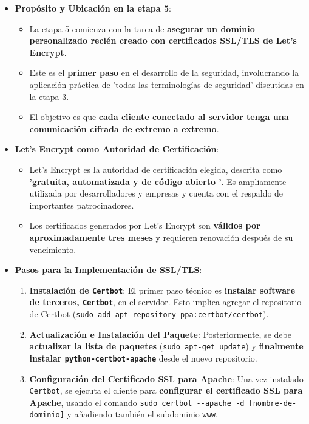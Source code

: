 \documentclass{report}
\begin{document}
\begin{itemize}
    \item \textbf{Propósito y Ubicación en la etapa 5}:
    \begin{itemize}
        \item La etapa 5 comienza con la tarea de \textbf{asegurar un dominio personalizado recién creado con certificados SSL/TLS de Let's Encrypt}.
        \item Este es el \textbf{primer paso} en el desarrollo de la seguridad, involucrando la aplicación práctica de  'todas las terminologías de 
        seguridad' discutidas en la etapa 3.
        \item El objetivo es que \textbf{cada cliente conectado al servidor tenga una comunicación cifrada de extremo a extremo}.
    \end{itemize}
    \item \textbf{Let's Encrypt como Autoridad de Certificación}:
    \begin{itemize}
        \item Let's Encrypt es la autoridad de certificación elegida, descrita como \textbf{ 'gratuita, automatizada y de código abierto '}. Es 
        ampliamente utilizada por desarrolladores y empresas y cuenta con el respaldo de importantes patrocinadores.
        \item Los certificados generados por Let's Encrypt son \textbf{válidos por aproximadamente tres meses} y requieren renovación después de su vencimiento.
    \end{itemize}
    \item \textbf{Pasos para la Implementación de SSL/TLS}:
    \begin{enumerate}
    \item \textbf{Instalación de \texttt{Certbot}}: El primer paso técnico es \textbf{instalar software de terceros, \texttt{Certbot}}, en el servidor. 
    Esto implica agregar el repositorio de Certbot (\verb|sudo add-apt-repository ppa:certbot/certbot|).
    \item \textbf{Actualización e Instalación del Paquete}: Posteriormente, se debe \textbf{actualizar la lista de paquetes} (\verb|sudo apt-get update|) 
    y \textbf{finalmente instalar \texttt{python-certbot-apache}} desde el nuevo repositorio.
    \item \textbf{Configuración del Certificado SSL para Apache}: Una vez instalado \texttt{Certbot}, se ejecuta el cliente para \textbf{configurar el 
    certificado SSL para Apache}, usando el comando \verb|sudo certbot --apache -d [nombre-de-dominio]| y añadiendo también el subdominio \texttt{www}. 

\end{enumerate}
\end{itemize}
\end{document}

